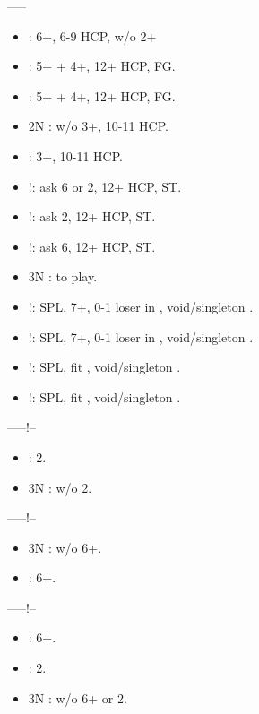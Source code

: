 \documentclass[12pt,twoside,a5paper]{report}%
\begin{document}
	------
	\begin{itemize}
	\renewcommand{\labelitemi}{}
	\item {} : 6+\di{}, 6-9 HCP, w/o 2+\cl{}
	\item {} : 5+\di{} + 4+\he{}, 12+ HCP, FG.
	\item {} : 5+\di{} + 4+\sp{}, 12+ HCP, FG.
	\item 2N : w/o 3+\cl{}, 10-11 HCP.
	\item {} : 3+\cl{}, 10-11 HCP.
	\item {}!: ask 6\cl{} or 2\di{}, 12+ HCP, ST.
	\item {}!: ask 2\di{}, 12+ HCP, ST.
	\item {}!: ask 6\cl{}, 12+ HCP, ST.
	\item 3N : to play.
	\item {}!: SPL, 7+\di{}, 0-1 loser in \di{}, void/singleton \he{}.
	\item {}!: SPL, 7+\di{}, 0-1 loser in \di{}, void/singleton \sp{}.
	\item {}!: SPL, fit \cl{}, void/singleton \he{}.
	\item {}!: SPL, fit \cl{}, void/singleton \sp{}.	
	\end{itemize}

	------!--
	\begin{itemize}
	\renewcommand{\labelitemi}{}
	\item {} : 2\di{}.
	\item 3N : w/o 2\di{}.
	\end{itemize}

	------!--
	\begin{itemize}
	\renewcommand{\labelitemi}{}
	\item 3N : w/o  6+\cl{}.
	\item {} : 6+\cl{}.
	\end{itemize}

	------!--
	\begin{itemize}
	\renewcommand{\labelitemi}{}
	\item {} : 6+\cl{}.
	\item {} : 2\di{}.
	\item 3N : w/o  6+\cl{} or 2\di{}.
	\end{itemize}
\end{document}
